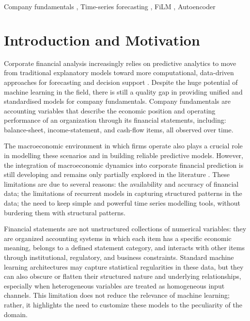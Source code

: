 \documentclass[a4paper,fleqn]{cas-dc}
\begin{document}
\begin{keywords}
Company fundamentals \sep
Time-series forecasting \sep 
FiLM \sep 
Autoencoder
\end{keywords}

\maketitle

\section{Introduction and Motivation}

Corporate financial analysis increasingly relies on predictive analytics to move from traditional explanatory models toward more computational, data-driven approaches for forecasting and decision support \citep{broby2022use}.
Despite the huge potential of machine learning in the field, there is still a quality gap in providing unified and standardised models for company fundamentals. Company fundamentals are accounting variables that describe the economic position and operating performance of an organization through its financial statements, including: balance-sheet, income-statement, and cash-flow items, all observed over time. 

The macroeconomic environment in which firms operate also plays a crucial role in modelling these scenarios and in building reliable predictive models. However, the integration of macroeconomic dynamics into corporate financial prediction is still developing and remains only partially explored in the literature \citep{zhao2024survey}. These limitations are due to several reasons: the availability and accuracy of financial data; the limitations of recurrent models in capturing structured patterns in the data; the need to keep simple and powerful time series modelling tools, without burdering them with structural patterns.

Financial statements are not unstructured collections of numerical variables: they are organized accounting systems in which each item has a specific economic meaning, belongs to a defined statement category, and interacts with other items through institutional, regulatory, and business constraints. Standard machine learning architectures may capture statistical regularities in these data, but they can also obscure or flatten their structured nature and underlying relationships, especially when heterogeneous variables are treated as homogeneous input channels. This limitation does not reduce the relevance of machine learning; rather, it highlights the need to customize these models to the peculiarity of the domain.
\end{document}
